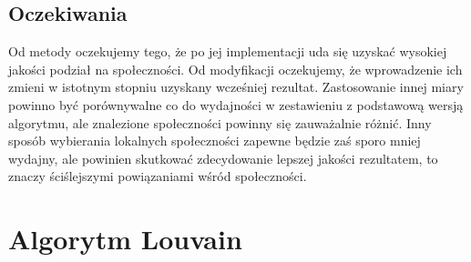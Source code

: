 \documentclass{article}
\begin{document}
\subsection{Oczekiwania}
Od metody oczekujemy tego, że po jej implementacji uda się uzyskać wysokiej jakości podział na społeczności. Od modyfikacji oczekujemy, że wprowadzenie ich zmieni w istotnym stopniu uzyskany wcześniej rezultat. Zastosowanie innej miary powinno być porównywalne co do wydajności w zestawieniu z podstawową wersją algorytmu, ale znalezione społeczności powinny się zauważalnie różnić. Inny sposób wybierania lokalnych społeczności zapewne będzie zaś sporo mniej wydajny, ale powinien skutkować zdecydowanie lepszej jakości rezultatem, to znaczy ściślejszymi powiązaniami wśród społeczności.
\newpage
\section{Algorytm Louvain}
\end{document}
